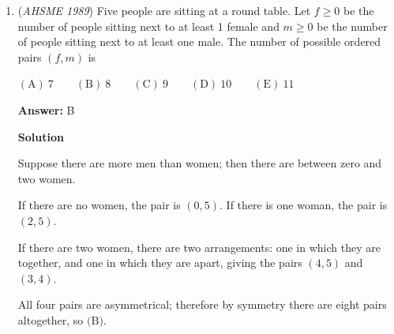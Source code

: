\begin{enumerate}
 After $1935$ minutes the 43rd square is enclosed and the particle is at the point $(0,43)$. During the 1936th minute it moves up to $(0,44)$. At the end of the 1980th minute it has moved right to $(44,44)$. After this it moves downward, and at the end of the 1989th minute it is at $(44,35)$. The answer is $\boxed{\textbf{(D)}}$.

 



\textbf{Solution 2}

Note that it takes $n^2+n$ minutes to travel to any point in the format $(n,n)$ <-- aka the top-right corners of the "square-like" shapes. (try this yourself if you dont believe it)

 Additionally, if $n$ is divisible by 2, the next step would be to go down parallel to the y-axis from $(n,n)$. Else, the next step would be to go left parallel to the x-axis from $(n,n)$. We now find a value for $n$ such that $n^2+n = n(n+1) \le 1989$. 

 Note that $40^2 = 1600$. After testing values over 40, we notice that $44(44+1) = 1980$. Therefore it takes 1980 seconds to move to $(44,44)$. Since $n$ is divisible by 2, we just need to move down $9$ units from $(44, 44)$, yielding the final answer of $\boxed{\textbf{(D)}}$.

 


	\item (\textit{AHSME 1989}) Five people are sitting at a round table. Let $f\geq 0$ be the number of people sitting next to at least 1 female and $m\geq0$ be the number of people sitting next to at least one male. The number of possible ordered pairs $(f,m)$ is


 $\mathrm{(A) \ 7 } \qquad \mathrm{(B) \ 8 } \qquad \mathrm{(C) \ 9 } \qquad \mathrm{(D) \ 10 } \qquad \mathrm{(E) \ 11 }$

 \textbf{Answer: }B



\textbf{Solution}

Suppose there are more men than women; then there are between zero and two women.

 If there are no women, the pair is $(0,5)$. If there is one woman, the pair is $(2,5)$.

 If there are two women, there are two arrangements: one in which they are together, and one in which they are apart, giving the pairs $(4,5)$ and $(3,4)$.

 All four pairs are asymmetrical; therefore by symmetry there are eight pairs altogether, so $\boxed{\textrm{(B)}}$.


\end{enumerate}
